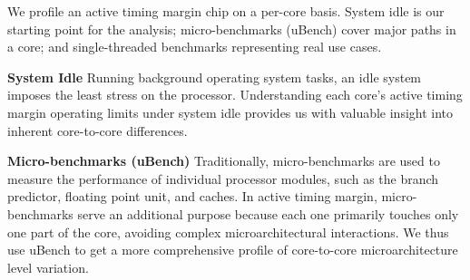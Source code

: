 We profile an active timing margin chip on a per-core basis. System idle is our starting point for the analysis; micro-benchmarks (uBench) cover major paths in a core; and single-threaded benchmarks representing real use cases.

\textbf{System Idle} Running background operating system tasks, an idle system imposes the least stress on the processor. {Understanding each core's active timing margin operating limits under system idle provides us with valuable insight into inherent core-to-core differences.}

\textbf{Micro-benchmarks (uBench)} Traditionally, micro-benchmarks are used to measure the performance of individual processor modules, such as the branch predictor, floating point unit, and caches. In active timing margin, micro-benchmarks serve an additional purpose because each one primarily touches only one part of the core, avoiding complex microarchitectural interactions. We thus use uBench to get a more comprehensive profile of core-to-core microarchitecture level variation.

